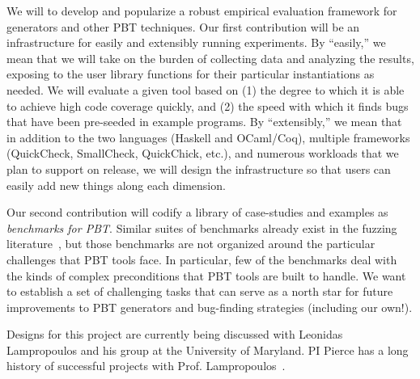 We will to develop and popularize a robust empirical evaluation framework for
generators and other PBT techniques. Our first contribution will be an
infrastructure for easily and extensibly running experiments.  By ``easily,'' we
mean that we will take on the burden of collecting data and analyzing the
results, exposing to the user library functions for their particular
instantiations as needed. We will evaluate a given tool based on (1) the degree
to which it is able to achieve high code coverage quickly, and (2) the speed
with which it finds bugs that have been pre-seeded in example programs. By
``extensibly,'' we mean that in addition to the two languages (Haskell and
OCaml/Coq), multiple frameworks (QuickCheck, SmallCheck, QuickChick, etc.), and
numerous workloads that we plan to support on release, we will design the
infrastructure so that users can easily add new things along each dimension.

Our second contribution will codify a library of case-studies and examples as
{\em benchmarks for PBT}. Similar suites of benchmarks already exist in the
fuzzing literature~\cite{hazimeh_magma_2021}, but those benchmarks are not
organized around the particular challenges that PBT tools face. In particular,
few of the benchmarks deal with the kinds of complex preconditions that PBT
tools are built to handle. We want to establish a set of challenging tasks that
can serve as a north star for future improvements to PBT generators and
bug-finding strategies (including our own!).

Designs for this project are currently being discussed with Leonidas
Lampropoulos and his group at the University of Maryland. PI Pierce has a long
history of successful projects with Prof.
Lampropoulos~\cite[etc.]{LuckPOPL,goldstein2021dojudgeatest,lampropoulos_coverage_2019,Lampropoulos&18,OLDlampropoulos19fuzzchick}.


